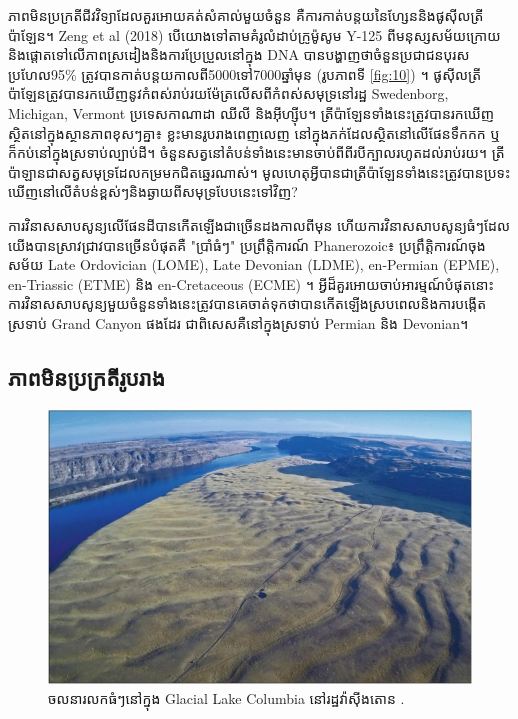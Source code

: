 \documentclass[10pt,twocolumn,letterpaper]{article}
\begin{document}
ភាពមិនប្រក្រតីជីវវិទ្យាដែលគួរអោយគត់សំគាល់មួយចំនួន គឺការកាត់បន្តយនៃហ្សែននិងផូសុីលត្រីប៉ាឡែន។ Zeng et al (2018) បើយោងទៅតាមគំរូលំដាប់ក្រូម៉ូសូម Y-125 ពីមនុស្សសម័យក្រោយ និងផ្តោតទៅលើភាពស្រដៀងនិងការប្រែប្រួលនៅក្នុង DNA បានបង្ហាញថាចំនួនប្រជាជនបុរសប្រហែល95\% ត្រូវបានកាត់បន្តយកាលពី5000ទៅ7000ឆ្នាំមុន (រូបភាពទី \ref{fig:10}) \cite{62}។ ផូសុីលត្រីប៉ាឡែនត្រូវបានរកឃើញនូវកំពស់រាប់រយម៉ែត្រលើសពីកំពស់សមុទ្រនៅរដ្ឋ Swedenborg, Michigan, Vermont ប្រទេសកាណាដា ឈីលី និងអ៊ីហ្ស៊ីប\cite{63,64,65,66}។ ត្រីប៉ាឡែនទាំងនេះត្រូវបានរកឃើញស្ថិតនៅក្នុងស្ថានភាពខុសៗគ្នា៖ ខ្លះមានរូបរាងពេញលេញ នៅក្នុងភក់ដែលស្ថិតនៅលើផែនទឹកកក ឬក៏កប់នៅក្នុងស្រទាប់ល្បាប់ដី។ ចំនួនសត្វនៅតំបន់ទាំងនេះមានចាប់ពីពីរបីក្បាលរហូតដល់រាប់រយ។ ត្រីប៉ាឡានជាសត្វសមុទ្រដែលកម្រមកជិតឆ្នេរណាស់។ មូលហេតុអ្វីបានជាត្រីប៉ាឡែនទាំងនេះត្រូវបានប្រទះឃើញនៅលើតំបន់ខ្ពស់ៗនិងឆ្ងាយពីសមុទ្របែបនេះទៅវិញ?

ការវិនាសសាបសូន្យលើផែនដីបានកើតឡើងជាច្រើនដងកាលពីមុន ហើយការវិនាសសាបសូន្យធំៗដែលយើងបានស្រាវជ្រាវបានច្រើនបំផុតគឺ "ប្រាំធំៗ" ប្រព្រឹត្តិការណ៍ Phanerozoic៖ ប្រព្រឹត្តិការណ៍ចុងសម័យ Late Ordovician (LOME), Late Devonian (LDME), en-Permian (EPME), en-Triassic (ETME) និង en-Cretaceous (ECME) \cite{88,89}។ អ្វីដ៏គួរអោយចាប់អារម្មណ៍បំផុតនោះ ការវិនាសសាបសូន្យមួយចំនួនទាំងនេះត្រូវបានគេចាត់ទុកថាបានកើតឡើងស្របពេលនិងការបង្កើតស្រទាប់ Grand Canyon ផងដែរ ជាពិសេសគឺនៅក្នុងស្រទាប់ Permian និង Devonian។

\subsection{ភាពមិនប្រក្រតីរូបរាង}

\begin{figure}[b]
\begin{center}
   \includegraphics[width=1\linewidth]{columbia.jpg}
\end{center}
   \caption{ចលនារលកធំៗនៅក្នុង Glacial Lake Columbia នៅរដ្ឋវ៉ាស៊ីងតោន \cite{80}.}
\label{fig:11}
\label{fig:onecol}
\end{figure}
\end{document}
